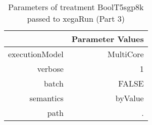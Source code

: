 \begin{table}[ht]
\centering
\begin{tabular}{rr}
  \hline
 & Parameter Values \\ 
  \hline
executionModel & MultiCore \\ 
  verbose & 1 \\ 
  batch & FALSE \\ 
  semantics & byValue \\ 
  path & . \\ 
   \hline
\end{tabular}
\caption{ Parameters of treatment BoolT5sgp8k passed to xegaRun
 (Part 3)} 
\end{table}
